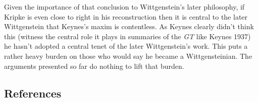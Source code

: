 \documentclass[
  11pt,
  letterpaper,
  DIV=11,
  numbers=noendperiod,
  twoside]{scrartcl}
\begin{document}
Given the importance of that conclusion to Wittgenstein's later
philosophy, if Kripke is even close to right in his reconstruction then
it is central to the later Wittgenstein that Keynes's maxim is
contentless. As Keynes clearly didn't think this (witness the central
role it plays in summaries of the \emph{GT} like Keynes 1937) he hasn't
adopted a central tenet of the later Wittgenstein's work. This puts a
rather heavy burden on those who would say he became a Wittgensteinian.
The arguments presented so far do nothing to lift that burden.

\subsection*{References}\label{references}
\end{document}
